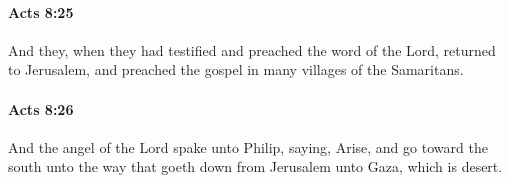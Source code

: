 		\paragraph{Acts 8:25} %
			\label{ACTS-8-25}

			And they, when they had testified and preached the word of the Lord, returned to Jerusalem, and preached the gospel in many villages of the Samaritans.

			\begin{framed}
			\scriptsize
				\begin{compactdesc}
					\item[SBLG] 
				\end{compactdesc}
			\end{framed}

		\paragraph{Acts 8:26} %
			\label{ACTS-8-26}

			And the angel of the Lord spake unto Philip, saying, Arise, and go toward the south unto the way that goeth down from Jerusalem unto Gaza, which is desert.

